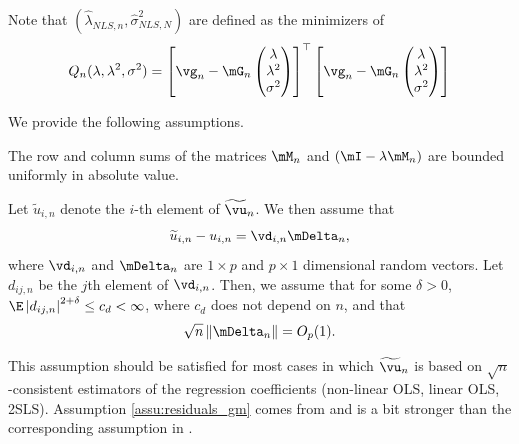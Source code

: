 \documentclass[english,12pt]{book}\usepackage[]{graphicx}\usepackage[]{xcolor}
\begin{document}
Note that $(\widehat{\lambda}_{NLS, n}, \widehat{\sigma}^2_{NLS, N})$ are defined as the minimizers of
\begin{equation}\label{eq:Qn-sem-mom}
Q_n(\lambda, \lambda^2, \sigma^2) = \left[\vg_n - \mG_n \begin{pmatrix}\lambda \\ \lambda ^2 \\ \sigma^2\end{pmatrix}\right]^\top \left[\vg_n - \mG_n \begin{pmatrix}\lambda \\ \lambda ^2 \\ \sigma^2\end{pmatrix}\right]
\end{equation}

We provide the following assumptions. 
\begin{assumption}\label{assu:bounded_matrix_M}
The row and column sums of the matrices $\mM_n$ and $(\mI - \lambda\mM_n)$ are bounded uniformly in absolute value.
\end{assumption}

\begin{assumption}\label{assu:residuals_gm}
Let $\widetilde{u}_{i, n}$ denote the $i$-th element of $\widetilde{\vu}_n$. We then assume that
\begin{equation*}
\widetilde{u}_{i, n} - u_{i,n} = \vd_{i,n}\mDelta_n, 
\end{equation*}
%
where $\vd_{i, n}$ and $\mDelta_n$ are $1\times p$ and $p\times 1$ dimensional random vectors. Let $d_{ij,n}$ be the $j$th element of $\vd_{i, n}$. Then, we assume that for some $\delta>0$, $\E\left|d_{ij,n}\right|^{2 + \delta}\leq c_{d} < \infty$, where $c_d$ does not depend on $n$, and that
\begin{equation}
\sqrt{n}\left\lVert \mDelta_n\right\rVert = O_p(1).
\end{equation}
\end{assumption}

This assumption should be satisfied for most cases in which $\widetilde{\vu}_n$ is based on $\sqrt{n}$-consistent estimators of the regression coefficients (non-linear OLS, linear OLS, 2SLS). Assumption \ref{assu:residuals_gm} comes from \cite{kelejian2010specification} and is a bit stronger than the corresponding assumption in \cite{kelejian1999generalized}.
\end{document}
